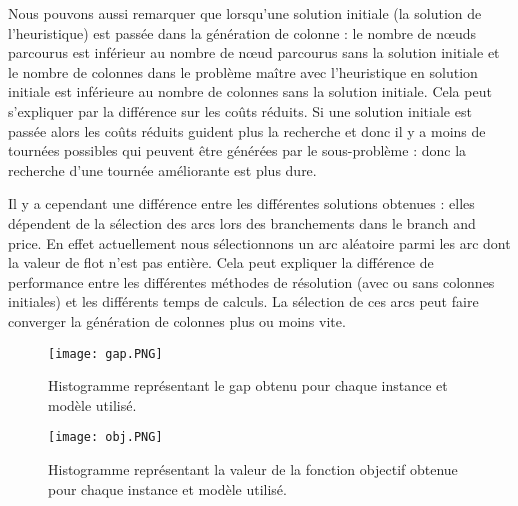 Nous pouvons aussi remarquer que lorsqu'une solution initiale (la solution de l'heuristique) est passée dans la génération de colonne : le nombre de n\oe uds parcourus est inférieur au nombre de n\oe ud parcourus sans la solution initiale et le nombre de colonnes dans le problème maître avec l'heuristique en solution initiale est inférieure au nombre de colonnes sans la solution initiale.
Cela peut s'expliquer par la différence sur les coûts réduits.
Si une solution initiale est passée alors les coûts réduits guident plus la recherche et donc il y a moins de tournées possibles qui peuvent être générées par le sous-problème : donc la recherche d'une tournée améliorante est plus dure.


Il y a cependant une différence entre les différentes solutions obtenues : elles dépendent de la sélection des arcs lors des branchements dans le branch and price.
En effet actuellement nous sélectionnons un arc aléatoire parmi les arc dont la valeur de flot n'est pas entière.
Cela peut expliquer la différence de performance entre les différentes méthodes de résolution (avec ou sans colonnes initiales) et les différents temps de calculs.
La sélection de ces arcs peut faire converger la génération de colonnes plus ou moins vite.


\begin{center}


\begin{figure}
[H]
\texttt{[image: gap.PNG]}
\caption{Histogramme représentant le gap obtenu pour chaque instance et modèle utilisé.\label{fig:gap}}
\end{figure}
\end{center}

\newpage
\begin{center}
\begin{figure}
[H]
\texttt{[image: obj.PNG]}
\caption{Histogramme représentant la valeur de la fonction objectif obtenue pour chaque instance et modèle utilisé.\label{fig:obj}}
\end{figure}
\end{center}


